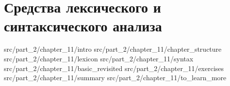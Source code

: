 \chapter{Средства лексического и синтаксического анализа}
\label{chpt:tools_for_lexical_analysis_and_parsing}

 {src/part_2/chapter_11/intro}
 {src/part_2/chapter_11/chapter_structure}
 {src/part_2/chapter_11/lexicon}
 {src/part_2/chapter_11/syntax}
 {src/part_2/chapter_11/basic_revisited}
 {src/part_2/chapter_11/exercises}
 {src/part_2/chapter_11/summary}
 {src/part_2/chapter_11/to_learn_more}